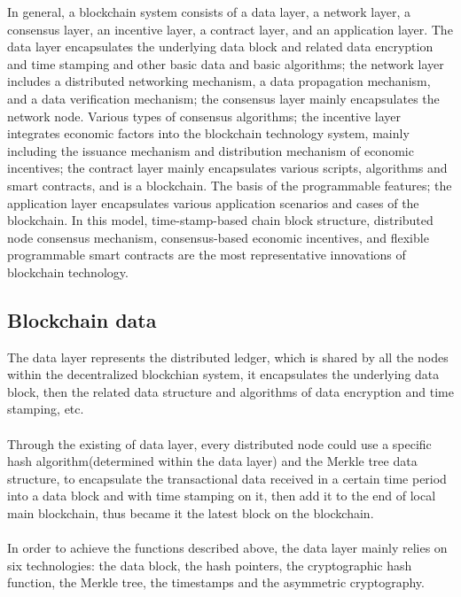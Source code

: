 \documentclass[doublespacing]{bmcart}
\begin{document}
\begin{CJK*}{UTF8}{gbsn}
In general, a blockchain system consists of a data layer, a network layer, a consensus layer, an incentive layer, a contract layer, and an application layer. The data layer encapsulates the underlying data block and related data encryption and time stamping and other basic data and basic algorithms; the network layer includes a distributed networking mechanism, a data propagation mechanism, and a data verification mechanism; the consensus layer mainly encapsulates the network node. Various types of consensus algorithms; the incentive layer integrates economic factors into the blockchain technology system, mainly including the issuance mechanism and distribution mechanism of economic incentives; the contract layer mainly encapsulates various scripts, algorithms and smart contracts, and is a blockchain. The basis of the programmable features; the application layer encapsulates various application scenarios and cases of the blockchain. In this model, time-stamp-based chain block structure, distributed node consensus mechanism, consensus-based economic incentives, and flexible programmable smart contracts are the most representative innovations of blockchain technology.

\subsection{Blockchain data}
The data layer represents the distributed ledger, which is shared by all the nodes within the decentralized blockchian system, it encapsulates the underlying data block, then the related data structure and algorithms of data encryption and time stamping, etc.
\paragraph{} 
Through the existing of data layer, every distributed node could use a specific hash algorithm(determined within the data layer) and the Merkle tree data structure, to encapsulate the transactional data received in a certain time period into a data block and with time stamping on it, then add it to the end of local main blockchain, thus became it the latest block on the blockchain.
\paragraph{} 
In order to achieve the functions described above, the data layer mainly relies on six technologies: the data block, the hash pointers, the cryptographic hash function, the Merkle tree, the timestamps and the asymmetric cryptography.

\end{CJK*}
\end{document}
